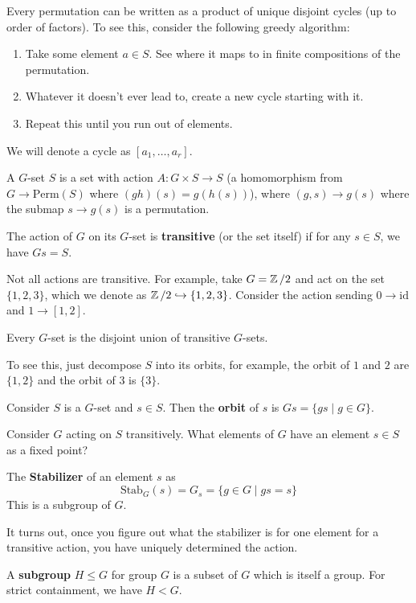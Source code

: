 Every permutation can be written as a product of unique disjoint cycles (up to order of factors).
To see this, consider the following greedy algorithm:
\begin{enumerate}
    \item Take some element $a \in S$. See where it maps to in finite compositions of the permutation.
    \item Whatever it doesn't ever lead to, create a new cycle starting with it.
    \item Repeat this until you run out of elements.
\end{enumerate}
We will denote a cycle as $[a_1, \dots, a_r]$.
\begin{definition}
    A $G$-set $S$ is a set with action $A: G \times S \to S$ (a homomorphism
    from $G \to \text{Perm}(S)$ where $(gh)(s) = g(h(s))$), where $(g, s) \to g(s)$ where the submap $s \to g(s) $ is a permutation.
\end{definition}
\begin{definition}
    The action of $G$ on its $G$-set is \textbf{transitive} (or the set itself) if for any $s \in S$,
    we have $Gs = S$.
\end{definition}
Not all actions are transitive. For example, take $G = \operatorname{\mathbb{Z}}/2$ and act on the set $\{1, 2, 3\}$,
which we denote as $\operatorname{\mathbb{Z}}/2 \hookrightarrow \{1, 2, 3\}$. Consider the action sending $0 \to \text{id}$
and $1 \to [1, 2]$.
\begin{theorem}
    Every $G$-set is the disjoint union of transitive $G$-sets.
\end{theorem}
To see this, just decompose $S$ into its orbits, for example, the orbit of $1$ and $2$ are $\{1, 2\}$
and the orbit of $3$ is $\{3\}$.
\begin{definition}
    Consider $S$ is a $G$-set and $s \in S$. Then the \textbf{orbit} of $s$ is $Gs = \{ gs \mid g \in G \}$.
\end{definition}
Consider $G$ acting on $S$ transitively. What elements of $G$
have an element $s \in S$ as a fixed point? 
\begin{definition}
    The \textbf{Stabilizer} of an element $s$ as
    \[ \text{Stab}_G(s) = G_s = \{ g \in G \mid gs = s \} \]
    This is a subgroup of $G$.
\end{definition}
It turns out, once you figure out what the stabilizer is for one element for a transitive
action, you have uniquely determined the action.
\begin{definition}
    A \textbf{subgroup} $H \le G$ for group $G$ is a subset of $G$ which is itself a group.
    For strict containment, we have $H < G$.
\end{definition}
